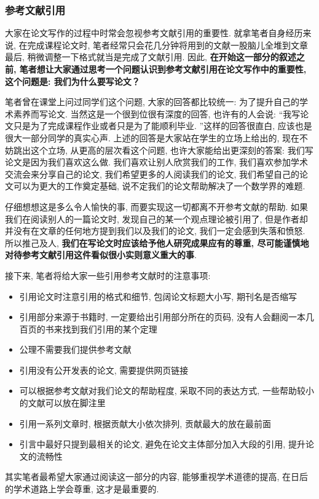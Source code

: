 \documentclass{formatBook}
\begin{document}
\subsubsection{参考文献引用}
大家在论文写作的过程中时常会忽视参考文献引用的重要性. 就拿笔者自身经历来说, 在完成课程论文时, 笔者经常只会花几分钟将用到的文献一股脑儿全堆到文章最后, 稍微调整一下格式就当是完成了文献引用. 因此, \textbf{在开始这一部分的叙述之前, 笔者想让大家通过思考一个问题认识到参考文献引用在论文写作中的重要性, 这个问题是: 我们为什么要写论文？}\par
笔者曾在课堂上问过同学们这个问题, 大家的回答都比较统一: 为了提升自己的学术素养而写论文. 当然这是一个很到位很有深度的回答, 也许有的人会说: “我写论文只是为了完成课程作业或者只是为了能顺利毕业. ”这样的回答很直白, 应该也是很大一部分同学的真实心声. 上述的回答是大家站在学生的立场上给出的, 现在不妨跳出这个立场, 从更高的层次看这个问题, 也许大家能给出更深刻的答案: 我们写论文是因为我们喜欢这么做. 我们喜欢让别人欣赏我们的工作, 我们喜欢参加学术交流会来分享自己的论文, 我们希望更多的人阅读我们的论文, 我们希望自己的论文可以为更大的工作奠定基础, 说不定我们的论文帮助解决了一个数学界的难题. \par
仔细想想这是多么令人愉快的事, 而要实现这一切都离不开参考文献的帮助. 如果我们在阅读别人的一篇论文时, 发现自己的某一个观点理论被引用了, 但是作者却并没有在文章的任何地方提到我们以及我们的论文, 我们一定会感到失落和愤怒. 所以推己及人, \textbf{我们在写论文时应该给予他人研究成果应有的尊重, 尽可能谨慎地对待参考文献引用这件看似很小实则意义重大的事}. \par
接下来, 笔者将给大家一些引用参考文献时的注意事项: 
\begin{itemize}
    \item 引用论文时注意引用的格式和细节, 包阔论文标题大小写, 期刊名是否缩写
    \item 引用部分来源于书籍时, 一定要给出引用部分所在的页码, 没有人会翻阅一本几百页的书来找到我们引用的某个定理
    \item 公理不需要我们提供参考文献
    \item 引用没有公开发表的论文, 需要提供网页链接
    \item 可以根据参考文献对我们论文的帮助程度, 采取不同的表达方式, 一些帮助较小的文献可以放在脚注里
    \item 引用一系列文章时, 根据贡献大小依次排列, 贡献最大的放在最前面
    \item 引言中最好只提到最相关的论文, 避免在论文主体部分加入大段的引用, 提升论文的流畅性
\end{itemize}
\par
其实笔者最希望大家通过阅读这一部分的内容, 能够重视学术道德的提高, 在日后的学术道路上学会尊重, 这才是最重要的. 
\end{document}
